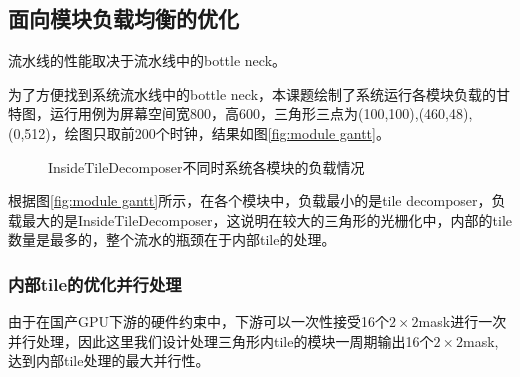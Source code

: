 \subsection{面向模块负载均衡的优化}
流水线的性能取决于流水线中的bottle neck。

为了方便找到系统流水线中的bottle neck，本课题绘制了系统运行各模块负载的甘特图，运行用例为屏幕空间宽800，高600，三角形三点为(100,100),(460,48),(0,512)，绘图只取前200个时钟，结果如图\ref{fig:module gantt}。
\begin{figure}[H]
    \centering
    \caption{InsideTileDecomposer不同时系统各模块的负载情况}
\end{figure}

根据图\ref{fig:module gantt}所示，在各个模块中，负载最小的是tile decomposer，负载最大的是InsideTileDecomposer，这说明在较大的三角形的光栅化中，内部的tile数量是最多的，整个流水的瓶颈在于内部tile的处理。

\subsubsection{内部tile的优化并行处理}
由于在国产GPU下游的硬件约束中，下游可以一次性接受16个$2\times 2$mask进行一次并行处理，因此这里我们设计处理三角形内tile的模块一周期输出16个$2\times 2$mask,达到内部tile处理的最大并行性。



